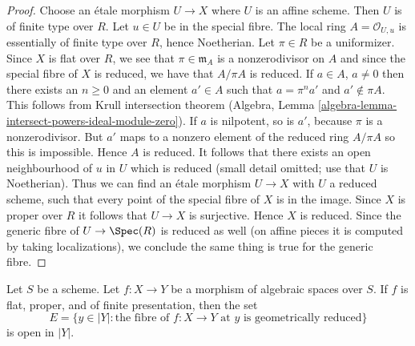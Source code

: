 \begin{proof}
Choose an \'etale morphism $U \to X$ where $U$ is an affine scheme.
Then $U$ is of finite type over $R$. Let $u \in U$ be in the special fibre.
The local ring $A = \mathcal{O}_{U, u}$ is essentially of finite
type over $R$, hence Noetherian. Let $\pi \in R$ be a uniformizer.
Since $X$ is flat over $R$, we see that $\pi \in \mathfrak m_A$
is a nonzerodivisor on $A$ and since the special fibre of $X$
is reduced, we have that $A/\pi A$ is reduced.
If $a \in A$, $a \not = 0$ then there exists an $n \geq 0$ and an element
$a' \in A$ such that $a = \pi^n a'$ and $a' \not \in \pi A$.
This follows from Krull intersection theorem
(Algebra, Lemma \ref{algebra-lemma-intersect-powers-ideal-module-zero}).
If $a$ is nilpotent, so is $a'$, because $\pi$ is a nonzerodivisor.
But $a'$ maps to a nonzero element of the reduced ring $A/\pi A$
so this is impossible. Hence $A$ is reduced. It follows that
there exists an open neighbourhood of $u$ in $U$ which is reduced
(small detail omitted; use that $U$ is Noetherian).
Thus we can find an \'etale morphism $U \to X$ with $U$ a reduced
scheme, such that every point of the special fibre of $X$ is
in the image. Since $X$ is proper over $R$ it follows that
$U \to X$ is surjective. Hence $X$ is reduced. Since the generic fibre of
$U \to \Spec(R)$ is reduced as well (on affine pieces
it is computed by taking localizations), we conclude the same thing
is true for the generic fibre.
\end{proof}

\begin{lemma}
\label{lemma-geometrically-reduced-open}
Let $S$ be a scheme. Let $f : X \to Y$ be a morphism of algebraic
spaces over $S$. If $f$ is flat, proper, and of finite presentation,
then the set
$$
E = \{y \in |Y| : \text{the fibre of }f : X \to Y\text{ at }y
\text{ is geometrically reduced}\}
$$
is open in $|Y|$.
\end{lemma}

